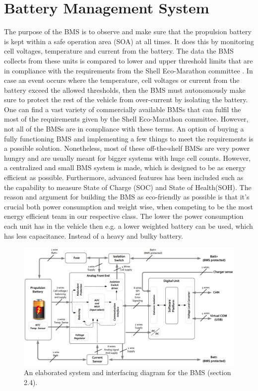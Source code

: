\newpage
\section{Battery Management System}
\label{sec:BMSHWChapter}
The purpose of the BMS is to observe and make sure that the propulsion battery is kept within a safe operation area (SOA) at all times. It does this by monitoring cell voltages, temperature and current from the battery. The data the BMS collects from these units is compared to lower and upper threshold limits that are in compliance with the requirements from the Shell Eco-Marathon committee \cite{ShellRequirements}. In case an event occurs where the temperature, cell voltages or current from the battery exceed the allowed thresholds, then the BMS must autonomously make sure to protect the rest of the vehicle from over-current by isolating the battery. \\
One can find a vast variety of commercially available BMSs that can fulfil the most of the requirements given by the Shell Eco-Marathon committee. However, not all of the BMSs are in compliance with these terms. An option of buying a fully functioning BMS and implementing a few things to meet the requirements is a possible solution. Nonetheless, most of these off-the-shelf BMSs are very power hungry and are usually meant for bigger systems with huge cell counts. However, a centralized and small BMS system is made, which is designed to be as energy efficient as possible. Furthermore, advanced features has been included such as the capability to measure State of Charge (SOC) and State of Health(SOH). The reason and argument for building the BMS as eco-friendly as possible is that it's crucial both power consumption and weight wise, when competing to be the most energy efficient team in our respective class. The lower the power consumption each unit has in the vehicle then e.g. a lower weighted battery can be used, which has less capacitance. Instead of a heavy and bulky battery.\\

\begin{figure}[H]
	\centering
	\includegraphics[width=1.0\linewidth]{Hardware/Pictures/BMSOverview}
	\caption[Empty]{An elaborated system and interfacing diagram for the BMS \cite{BMSDocumentation} (section 2.4).}
	\label{fig:BMSOverview}
\end{figure}


